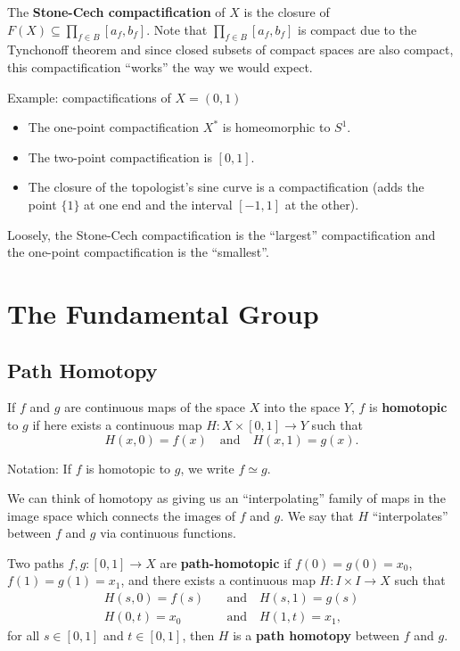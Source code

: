 \documentclass{article}
\newcommand{\nline}{\vspace*{0.5\baselineskip}}
\theoremstyle{definition}
\begin{document}
\begin{flushleft}
\nline

The \textbf{Stone-Cech compactification} of $X$ is the closure of $F(X) \subseteq \prod_{f \in B} [a_f, b_f]$. Note that $\prod_{f \in B} [a_f, b_f]$ is compact due to the Tynchonoff theorem and since closed subsets of compact spaces are also compact, this compactification ``works'' the way we would expect.

\nline

Example: compactifications of $X = (0,1)$

\begin{itemize}
    \item The one-point compactification $X^*$ is homeomorphic to $S^1$.
    \item The two-point compactification is $[0,1]$.
    \item The closure of the topologist's sine curve is a compactification (adds the point $\{1\}$ at one end and the interval $[-1,1]$ at the other).
\end{itemize}

Loosely, the Stone-Cech compactification is the ``largest'' compactification and the one-point compactification is the ``smallest''.

\section{The Fundamental Group}

\subsection{Path Homotopy}

If $f$ and $g$ are continuous maps of the space $X$ into the space $Y$, $f$ is \textbf{homotopic} to $g$ if here exists a continuous map $H : X \times [0,1] \to Y$ such that
\[
H(x, 0) = f(x) \quad \text{and} \quad H(x, 1) = g(x).
\]

Notation: If $f$ is homotopic to $g$, we write $f \simeq g$.

\nline

We can think of homotopy as giving us an ``interpolating'' family of maps in the image space which connects the images of $f$ and $g$. We say that $H$ ``interpolates'' between $f$ and $g$ via continuous functions.

\nline

Two paths $f, g : [0,1] \to X$ are \textbf{path-homotopic} if $f(0) = g(0) = x_0$, $f(1) = g(1) = x_1$, and there exists a continuous map $H : I \times I \to X$ such that
\[
\begin{align}
    H(s, 0) = f(s) \quad &\text{and} \quad H(s, 1) = g(s) \\
    H(0, t) = x_0 \quad &\text{and} \quad H(1, t) = x_1,
\end{align}
\]
for all $s \in [0,1]$ and $t \in [0,1]$, then $H$ is a \textbf{path homotopy} between $f$ and $g$.


\end{flushleft}
\end{document}
